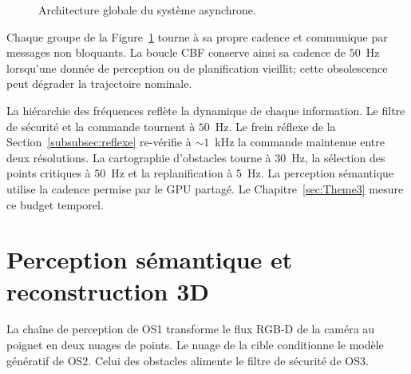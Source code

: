 \begin{figure}[htbp!]
{%
}
\caption{Architecture globale du système asynchrone.}
\label{fig:architecture_systeme_final_v12}
\end{figure}

Chaque groupe de la Figure~\ref{fig:architecture_systeme_final_v12} tourne à sa propre cadence et communique par messages non bloquants. La boucle \ac{CBF} conserve ainsi sa cadence de $50$~Hz lorsqu'une donnée de perception ou de planification vieillit; cette obsolescence peut dégrader la trajectoire nominale.

La hiérarchie des fréquences reflète la dynamique de chaque information. Le filtre de sécurité et la commande tournent à $50$~Hz. Le frein réflexe de la Section~\ref{subsubsec:reflexe} re-vérifie à ${\sim}1$~kHz la commande maintenue entre deux résolutions. La cartographie d'obstacles tourne à $30$~Hz, la sélection des points critiques à $50$~Hz et la replanification à $5$~Hz. La perception sémantique utilise la cadence permise par le \ac{GPU} partagé. Le Chapitre~\ref{sec:Theme3} mesure ce budget temporel.

\section{Perception sémantique et reconstruction 3D}
La chaîne de perception de \acs{OS}1 transforme le flux \ac{RGB-D} de la caméra au poignet en deux nuages de points. Le nuage de la cible conditionne le modèle génératif de \acs{OS}2. Celui des obstacles alimente le filtre de sécurité de \acs{OS}3.

